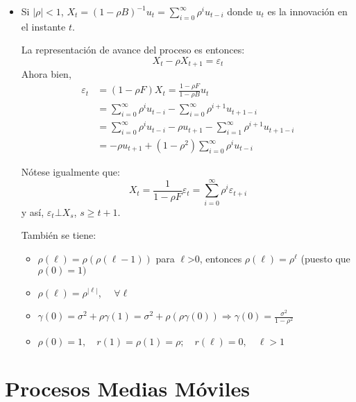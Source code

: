 \begin{ejemplo}
\begin{enumerate}
\begin{itemize}
\item Si $\left| \rho \right|<1$, $X_{t} =\left( {1-\rho B} \right)^{-1}u_{t} =\sum_{i=0}^\infty {\rho^{i}u_{t-i} } $
donde $u_{t} $ es la innovaci\'{o}n en el instante $t$.

La representaci\'{o}n de avance del proceso es entonces:
\[
X_{t} -\rho X_{t+1} =\varepsilon_{t} 
\]
Ahora bien, 
\begin{align*}
\varepsilon_{t} 
	&=\left( {1-\rho F} \right)X_{t} =\frac{1-\rho F}{1-\rho B}u_{t} \\
	&=\sum_{i=0}^\infty \rho^{i}u_{t-i} -\sum_{i=0}^\infty \rho ^{i+1}u_{t+1-i}\\
	&=\sum_{i=0}^\infty \rho^{i}u_{t-i} -\rho u_{t+1} -\sum_{i=1}^\infty \rho^{i+1}u_{t+1-i}\\
	&=-\rho u_{t+1} +\left( {1-\rho^{2}} \right)\sum_{i=0}^\infty {\rho^{i}u_{t-i} }   
\end{align*}

N\'{o}tese igualmente que: 
\[
X_{t} =\frac{1}{1-\rho F}\varepsilon_{t} =\sum_{i=0}^\infty {\rho^{i}\varepsilon_{t+i} } 
\]
y as\'{i}, $\varepsilon_{t} \bot X_{s}$, $s\geq t+1$.\newline

Tambi\'{e}n se tiene:
\begin{itemize}
\item $\rho \left( \ell \right)=\rho \left( {\rho \left( {\ell -1} \right)} 
\right)$ para $\ell $\textgreater 0, entonces $\rho \left( \ell \right)=\rho^{\ell }$ (puesto que $\rho \left( 0 \right)=1)$

\item $\rho \left( \ell \right)=\rho^{\left| \ell \right|}$, $\quad \forall \ell $

\item $\gamma \left( 0 \right)=\sigma^{2}+\rho \gamma \left( 1 \right)=\sigma^{2}+\rho \left( {\rho \gamma \left( 0 \right)} \right)\Rightarrow \gamma \left( 0 \right)=\displaystyle\frac{\sigma^{2}}{1-\rho^{2}}$

\item $\rho \left( 0 \right)=1, \quad r\left( 1 \right)=\rho \left( 1 \right)=\rho; \quad r\left( \ell \right)=0, \quad \ell >1$
\end{itemize}
\end{itemize}
\end{enumerate}

\end{ejemplo}

\section{Procesos Medias M\'{o}viles}

